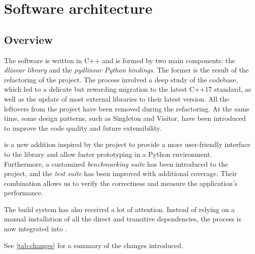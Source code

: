 \chapter{Software architecture}

\section{Overview}

The software is written in C++ and is formed by two main components: the \textit{dlinear library} and the \textit{pydlinear Python bindings}.
The former is the result of the refactoring of the \dlinearfour project.
The process involved a deep study of the codebase, which led to a delicate but rewarding migration to the latest C++17 standard, as well as the update of most external libraries to their latest version.
All the leftovers from the \dreal project have been removed during the refactoring. 
At the same time, some design patterns, such as Singleton and Visitor, have been introduced to improve the code quality and future extensibility.

\pydlinear is a new addition inspired by the \dreal project to provide a more user-friendly interface to the library and allow faster prototyping in a Python environment.
Furthermore, a customized \textit{benchmarking suite} has been introduced to the project, and the \textit{test suite} has been improved with additional coverage.
Their combination allows us to verify the correctness and measure the application's performance.

The build system has also received a lot of attention.
Instead of relying on a manual installation of all the direct and transitive dependencies, the process is now integrated into \bazel.

See \autoref{tab:changes} for a summary of the changes introduced.

